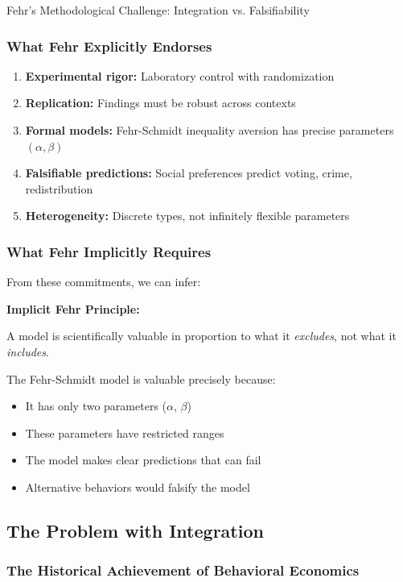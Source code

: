 \begin{chapter}{Fehr's Methodological Challenge: Integration vs. Falsifiability}
\subsubsection{What Fehr Explicitly Endorses}

\begin{enumerate}
    \item \textbf{Experimental rigor:} Laboratory control with randomization
    \item \textbf{Replication:} Findings must be robust across contexts
    \item \textbf{Formal models:} Fehr-Schmidt inequality aversion has precise parameters $(\alpha, \beta)$
    \item \textbf{Falsifiable predictions:} Social preferences predict voting, crime, redistribution
    \item \textbf{Heterogeneity:} Discrete types, not infinitely flexible parameters
\end{enumerate}

\subsubsection{What Fehr Implicitly Requires}

From these commitments, we can infer:

\begin{tcolorbox}[colback=gray!10!white,colframe=gray!75!black]
\textbf{Implicit Fehr Principle:}

A model is scientifically valuable in proportion to what it \textit{excludes}, not what it \textit{includes}.
\end{tcolorbox}

The Fehr-Schmidt model is valuable precisely because:
\begin{itemize}[noitemsep]
    \item It has only two parameters ($\alpha$, $\beta$)
    \item These parameters have restricted ranges
    \item The model makes clear predictions that can fail
    \item Alternative behaviors would falsify the model
\end{itemize}

\subsection{The Problem with Integration}

\subsubsection{The Historical Achievement of Behavioral Economics}


\end{chapter}
